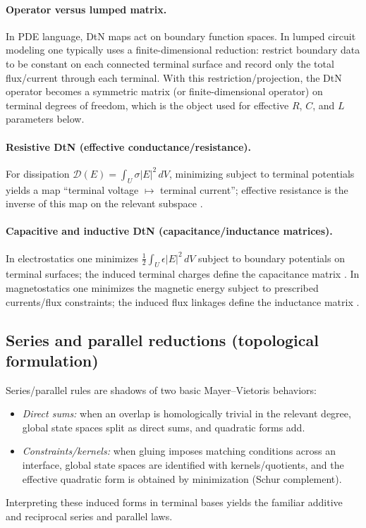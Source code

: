 \documentclass[11pt]{article}
\begin{document}
\paragraph{Operator versus lumped matrix.}
In PDE language, DtN maps act on boundary function spaces.
In lumped circuit modeling one typically uses a finite-dimensional reduction: restrict boundary data to be constant on each connected terminal surface and record only the total flux/current through each terminal.
With this restriction/projection, the DtN operator becomes a symmetric matrix (or finite-dimensional operator) on terminal degrees of freedom, which is the object used for effective $R$, $C$, and $L$ parameters below.

\paragraph{Resistive DtN (effective conductance/resistance).}
For dissipation $\mathcal{D}(E)=\int_U \sigma |E|^2\,dV$, minimizing subject to terminal potentials yields a map ``terminal voltage $\mapsto$ terminal current''; effective resistance is the inverse of this map on the relevant subspace \cite{jackson_em_1998,chua_desoer_kuh_1987}.

\paragraph{Capacitive and inductive DtN (capacitance/inductance matrices).}
In electrostatics one minimizes $\tfrac12\int_U \epsilon |E|^2\,dV$ subject to boundary potentials on terminal surfaces; the induced terminal charges define the capacitance matrix \cite{jackson_em_1998}.
In magnetostatics one minimizes the magnetic energy subject to prescribed currents/flux constraints; the induced flux linkages define the inductance matrix \cite{jackson_em_1998}.

\subsection{Series and parallel reductions (topological formulation)}
\label{sec:mv-series-parallel}
Series/parallel rules are shadows of two basic Mayer--Vietoris behaviors:
\begin{itemize}
  \item \emph{Direct sums:} when an overlap is homologically trivial in the relevant degree, global state spaces split as direct sums, and quadratic forms add.
  \item \emph{Constraints/kernels:} when gluing imposes matching conditions across an interface, global state spaces are identified with kernels/quotients, and the effective quadratic form is obtained by minimization (Schur complement).
\end{itemize}
Interpreting these induced forms in terminal bases yields the familiar additive and reciprocal series and parallel laws.
\end{document}
